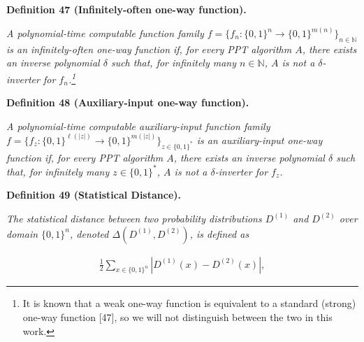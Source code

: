 



\par\medskip\noindent\textbf{
\textbf{Definition 47}\textbf{ }(Infinitely-often one-way function)\textbf{.}
}\par



\emph{A polynomial-time computable function family $f=\{f_{n}:\{0,1\}^{n}\to\{0,1\}^{m(n)}\}_{n\in\mathbb{N}}$ is an infinitely-often one-way function if, for every PPT algorithm $A$, there exists an inverse polynomial $\delta$ such that, for infinitely many $n\in\mathbb{N}$, $A$ is not a $\delta$-inverter for $f_{n}$.\footnote{It is known that a weak one-way function is equivalent to a standard (strong) one-way function [47], so we will not distinguish between the two in this work.}}\par







\par\medskip\noindent\textbf{
\textbf{Definition 48}\textbf{ }(Auxiliary-input one-way function)\textbf{.}
}\par



\emph{A polynomial-time computable auxiliary-input function family $f=\{f_{z}:\{0,1\}^{\ell(|z|)}\to\{0,1\}^{m(|z|)}\}_{z\in\{0,1\}^{*}}$ is an auxiliary-input one-way function if, for every PPT algorithm $A$, there exists an inverse polynomial $\delta$ such that, for infinitely many $z\in\{0,1\}^{*}$, $A$ is not a $\delta$-inverter for $f_{z}$.}\par







\par\medskip\noindent\textbf{
\textbf{Definition 49}\textbf{ }(Statistical Distance)\textbf{.}
}\par



\emph{The statistical distance between two probability distributions $D^{(1)}$ and $D^{(2)}$ over domain $\{0,1\}^{n}$, denoted $\Delta(D^{(1)},D^{(2)})$, is defined as}\par


\[\begin{gathered}
\frac{1}{2}\sum_{x\in\{0,1\}^{n}}\left|D^{(1)}(x)-D^{(2)}(x)\right|,
\end{gathered}\]


